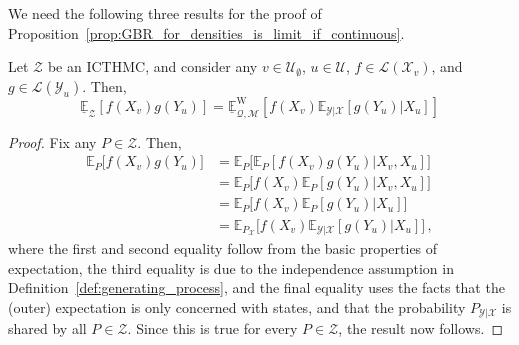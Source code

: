 \documentclass[twoside,11pt]{article}
\newcommand{\states}{\mathcal{X}}
\newcommand{\observs}{\mathcal{Y}}
\newcommand{\lexp}{\underline{\mathbb{E}}_{\rateset,\mathcal{M}}^\mathrm{W}}
\newcommand{\gambles}{\mathcal{L}}
\newcommand{\rateset}{\mathcal{Q}}
\begin{document}
We need the following three results for the proof of Proposition~\ref{prop:GBR_for_densities_is_limit_if_continuous}.

\begin{proposition}\label{prop:decomp}
Let $\mathcal{Z}$ be an ICTHMC, and consider any $v\in\mathcal{U}_\emptyset$, $u\in\mathcal{U}$, $f\in\gambles(\states_v)$, and $g\in\gambles(\observs_u)$. Then,
\begin{equation*}
\underline{\mathbb{E}}_\mathcal{Z}\left[ f(X_v)g(Y_u) \right] = \lexp\left[ f(X_v)\mathbb{E}_{\observs\vert\states}[g(Y_u)\vert X_u] \right] 
\end{equation*}
\end{proposition}
\begin{proof}
Fix any $P\in\mathcal{Z}$. Then,
\begin{align*}
\mathbb{E}_P\bigl[ f(X_v)g(Y_u) \bigr] &= \mathbb{E}_P\bigl[ \mathbb{E}_P\left[ f(X_v)g(Y_u) \vert X_v,X_u \right] \bigr] \\
&= \mathbb{E}_P\bigl[ f(X_v)\mathbb{E}_P[ g(Y_u) \vert X_v,X_u ] \bigr] \\
&= \mathbb{E}_P\bigl[ f(X_v)\mathbb{E}_P[ g(Y_u) \vert X_u ] \bigr] \\
&= \mathbb{E}_{P_\states}\bigl[ f(X_v)\mathbb{E}_{\observs\vert\states}[ g(Y_u) \vert X_u ] \bigr] \,,
\end{align*}
where the first and second equality follow from the basic properties of expectation, the third equality is due to the independence assumption in Definition~\ref{def:generating_process}, and the final equality uses the facts that the (outer) expectation is only concerned with states, and that the probability $P_{\observs\vert\states}$ is shared by all $P\in\mathcal{Z}$. Since this is true for every $P\in\mathcal{Z}$, the result now follows.
\end{proof}
\end{document}
